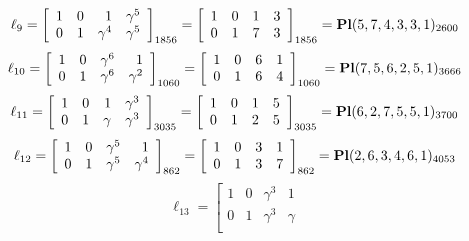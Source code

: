 \documentclass{article}
\begin{document}
{$$
\ell_{9} = 
\left[
\begin{array}{*{4}{r}}
1 & 0 & 1 & \gamma^{5}\\
0 & 1 & \gamma^{4} & \gamma^{5}\\
\end{array}
\right]
_{1856}
=
\left[
\begin{array}{*{4}c}
1  & 0  & 1  & 3\\
0  & 1  & 7  & 3\\
\end{array}
\right]_{1856}
={\rm\bf Pl}(5,7,4,3,3,1 )_{2600}$$
$$
\ell_{10} = 
\left[
\begin{array}{*{4}{r}}
1 & 0 & \gamma^{6} & 1\\
0 & 1 & \gamma^{6} & \gamma^{2}\\
\end{array}
\right]
_{1060}
=
\left[
\begin{array}{*{4}c}
1  & 0  & 6  & 1\\
0  & 1  & 6  & 4\\
\end{array}
\right]_{1060}
={\rm\bf Pl}(7,5,6,2,5,1 )_{3666}$$
$$
\ell_{11} = 
\left[
\begin{array}{*{4}{r}}
1 & 0 & 1 & \gamma^{3}\\
0 & 1 & \gamma  & \gamma^{3}\\
\end{array}
\right]
_{3035}
=
\left[
\begin{array}{*{4}c}
1  & 0  & 1  & 5\\
0  & 1  & 2  & 5\\
\end{array}
\right]_{3035}
={\rm\bf Pl}(6,2,7,5,5,1 )_{3700}$$
$$
\ell_{12} = 
\left[
\begin{array}{*{4}{r}}
1 & 0 & \gamma^{5} & 1\\
0 & 1 & \gamma^{5} & \gamma^{4}\\
\end{array}
\right]
_{862}
=
\left[
\begin{array}{*{4}c}
1  & 0  & 3  & 1\\
0  & 1  & 3  & 7\\
\end{array}
\right]_{862}
={\rm\bf Pl}(2,6,3,4,6,1 )_{4053}$$
$$
\ell_{13} = 
\left[
\begin{array}{*{4}{r}}
1 & 0 & \gamma^{3} & 1\\
0 & 1 & \gamma^{3} & \gamma \\
\end{array}
$$}
\end{document}
